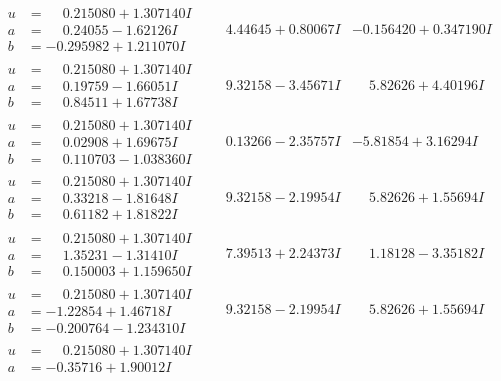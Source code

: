 \documentclass[1p]{elsarticle_modified}
\theoremstyle{definition}
\begin{document}
$$\begin{array}{c|c|c}
\begin{aligned}
u &= \phantom{-}0.215080 + 1.307140 I \\
a &= \phantom{-}0.24055 - 1.62126 I \\
b &= -0.295982 + 1.211070 I\end{aligned}
 & \phantom{-}4.44645 + 0.80067 I & -0.156420 + 0.347190 I \\ \hline\begin{aligned}
u &= \phantom{-}0.215080 + 1.307140 I \\
a &= \phantom{-}0.19759 - 1.66051 I \\
b &= \phantom{-}0.84511 + 1.67738 I\end{aligned}
 & \phantom{-}9.32158 - 3.45671 I & \phantom{-}5.82626 + 4.40196 I \\ \hline\begin{aligned}
u &= \phantom{-}0.215080 + 1.307140 I \\
a &= \phantom{-}0.02908 + 1.69675 I \\
b &= \phantom{-}0.110703 - 1.038360 I\end{aligned}
 & \phantom{-}0.13266 - 2.35757 I & -5.81854 + 3.16294 I \\ \hline\begin{aligned}
u &= \phantom{-}0.215080 + 1.307140 I \\
a &= \phantom{-}0.33218 - 1.81648 I \\
b &= \phantom{-}0.61182 + 1.81822 I\end{aligned}
 & \phantom{-}9.32158 - 2.19954 I & \phantom{-}5.82626 + 1.55694 I \\ \hline\begin{aligned}
u &= \phantom{-}0.215080 + 1.307140 I \\
a &= \phantom{-}1.35231 - 1.31410 I \\
b &= \phantom{-}0.150003 + 1.159650 I\end{aligned}
 & \phantom{-}7.39513 + 2.24373 I & \phantom{-}1.18128 - 3.35182 I \\ \hline\begin{aligned}
u &= \phantom{-}0.215080 + 1.307140 I \\
a &= -1.22854 + 1.46718 I \\
b &= -0.200764 - 1.234310 I\end{aligned}
 & \phantom{-}9.32158 - 2.19954 I & \phantom{-}5.82626 + 1.55694 I \\ \hline\begin{aligned}
u &= \phantom{-}0.215080 + 1.307140 I \\
a &= -0.35716 + 1.90012 I \\

\end{aligned}
\end{array}$$
\end{document}
